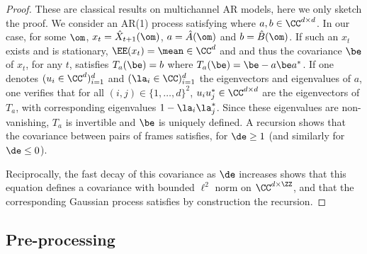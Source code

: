 \begin{proof}
	These are classical results on multichannel AR models, here we only sketch the proof. 
	We consider an AR(1) process satisfying 
	where $a, b \in \CC^{d \times d}$. In our case, for some $\om$, $x_t = \hat X_{t+1}(\om)$, $a = \hat A(\om)$ and $b = \hat B(\om)$. If such an $x_t$ exists and is stationary, $\EE(x_t)=\mean \in \CC^d$ and 
	and thus the covariance $\be$ of $x_t$, for any $t$, satisfies $T_a(\be) = b$ where $T_a(\be) =  \be - a \be a^*$. If one denotes $(u_i \in \CC^d)_{i=1}^d$ and $(\la_i \in \CC)_{i=1}^d$ the eigenvectors and eigenvalues of $a$, one verifies that for all $(i,j) \in \{1,\ldots,d\}^2$, $u_i u_j^* \in \CC^{d \times d}$ are the eigenvectors of $T_{a}$, with corresponding eigenvalues $1-\la_i \la_j^*$. Since these eigenvalues are non-vanishing, $T_a$ is invertible and $\be$ is uniquely defined. A recursion shows that the covariance between pairs of frames satisfies, for $\de \geq 1$
	(and similarly for $\de \leq 0$). 

	Reciprocally, the fast decay of this covariance as $\de$ increases shows that this equation defines a covariance with bounded $\ell^2$ norm on $\CC^{d \times \ZZ}$, and that the corresponding Gaussian process satisfies by construction the recursion. %

\end{proof}

\subsection{Pre-processing} 


